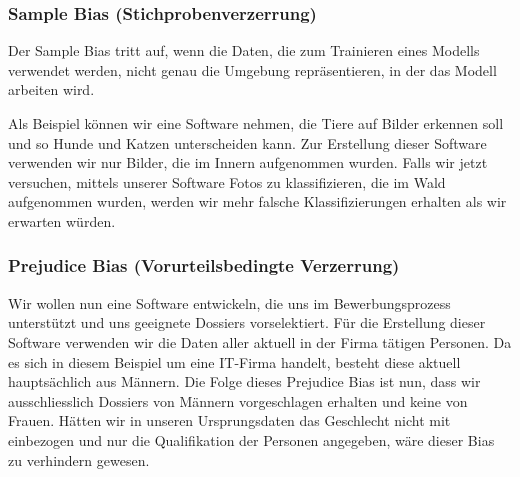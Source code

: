 \subsubsection{Sample Bias (Stichprobenverzerrung)}
Der Sample Bias tritt auf, wenn die Daten, die zum Trainieren eines Modells verwendet werden, nicht genau die Umgebung repräsentieren, in der das Modell arbeiten wird. 

Als Beispiel können wir eine Software nehmen, die Tiere auf Bilder erkennen soll und so Hunde und Katzen unterscheiden kann. Zur Erstellung dieser Software verwenden wir nur Bilder, die im Innern aufgenommen wurden. Falls wir jetzt versuchen, mittels unserer Software Fotos zu klassifizieren, die im Wald aufgenommen wurden, werden wir mehr falsche Klassifizierungen erhalten als wir erwarten würden.

\subsubsection{Prejudice Bias (Vorurteilsbedingte Verzerrung)}
Wir wollen nun eine Software entwickeln, die uns im Bewerbungsprozess unterstützt und uns geeignete Dossiers vorselektiert.
Für die Erstellung dieser Software verwenden wir die Daten aller aktuell in der Firma tätigen Personen. Da es sich in diesem Beispiel um eine IT-Firma handelt, besteht diese aktuell hauptsächlich aus Männern.
Die Folge dieses Prejudice Bias ist nun, dass wir ausschliesslich Dossiers von Männern vorgeschlagen erhalten und keine von Frauen.
Hätten wir in unseren Ursprungsdaten das Geschlecht nicht mit einbezogen und nur die Qualifikation der Personen angegeben, wäre dieser Bias zu verhindern gewesen.